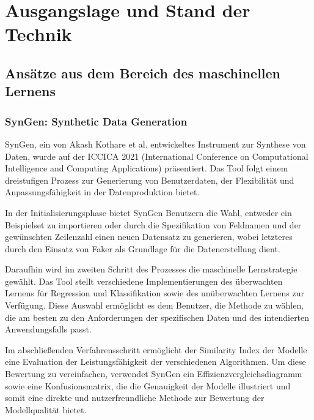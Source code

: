 
\chapter{Ausgangslage und Stand der Technik}
\label{cha:stateOfTheArt}

\section{Ansätze aus dem Bereich des maschinellen Lernens}

\subsection{SynGen: Synthetic Data Generation}

SynGen, ein von Akash Kothare et al.\cite{9697232} entwickeltes Instrument zur Synthese von Daten, wurde auf der ICCICA 2021 (International Conference on Computational Intelligence and Computing Applications) präsentiert.
Das Tool folgt einem dreistufigen Prozess zur Generierung von Benutzerdaten, der Flexibilität und Anpassungsfähigkeit in der Datenproduktion bietet.

In der Initialisierungsphase bietet SynGen Benutzern die Wahl, entweder ein Beispielset zu importieren oder durch die Spezifikation von Feldnamen und der gewünschten Zeilenzahl einen neuen
Datensatz zu generieren, wobei letzteres durch den Einsatz von Faker\cite{Faker} als Grundlage für die Datenerstellung dient.

Daraufhin wird im zweiten Schritt des Prozesses die maschinelle Lernstrategie gewählt. Das Tool stellt verschiedene Implementierungen des überwachten Lernens für Regression und
Klassifikation sowie des unüberwachten Lernens zur Verfügung. Diese Auswahl ermöglicht es dem Benutzer, die Methode zu wählen, die am besten zu den Anforderungen der spezifischen Daten und des intendierten Anwendungsfalls passt.

Im abschließenden Verfahrensschritt ermöglicht der Similarity Index der Modelle eine Evaluation der Leistungsfähigkeit der verschiedenen Algorithmen. Um diese Bewertung zu vereinfachen,
verwendet SynGen ein Effizienzvergleichsdiagramm sowie eine Konfusionsmatrix, die die Genauigkeit der Modelle illustriert und somit eine direkte und nutzerfreundliche Methode zur Bewertung der Modellqualität bietet.


